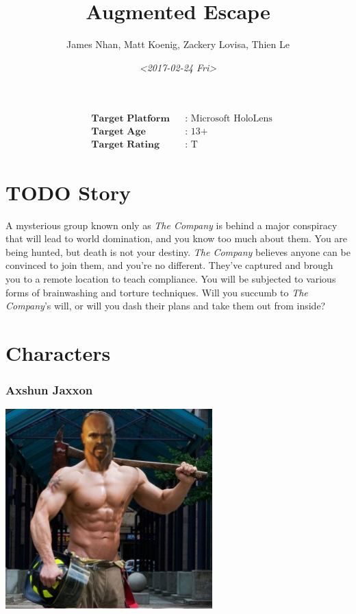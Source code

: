 \documentclass[11pt]{article}
\author{James Nhan, Matt Koenig, Zackery Lovisa, Thien Le}
\date{\textit{<2017-02-24 Fri>}}
\title{Augmented Escape}
\begin{document}
\maketitle
\begin{align*}
   &\textbf{Target Platform}&&\text{: Microsoft HoloLens} \\
   &\textbf{Target Age}&&\text{: 13+} \\
   &\textbf{Target Rating}&&\text{: T}
\end{align*}

\pagebreak

\tableofcontents

\pagebreak

\section{{\bfseries\sffamily TODO} Story}
\label{sec:orgb8b0a4d}
A mysterious group known only as \emph{The Company} is behind a major conspiracy that will lead to world domination, and you know too much about them. You are being hunted, but death is not your destiny. \emph{The Company} believes anyone can be convinced to join them, and you're no different. They've captured and brough you to a remote location to teach compliance. You will be subjected to various forms of brainwashing and torture techniques. Will you succumb to \emph{The Company}'s will, or will you dash their plans and take them out from inside?

\section{Characters}
\label{sec:org8504d18}
\subsubsection{Axshun Jaxxon}
\label{sec:org493e81c}
\begin{center}
\includegraphics[width=8cm]{./img/axshun-jaxxon.png}
\end{center}
\end{document}
